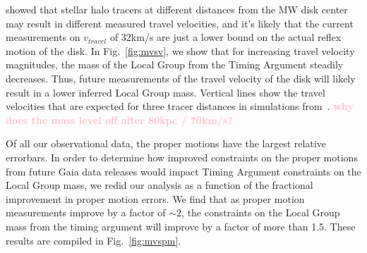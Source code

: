\documentclass[twocolumn]{aastex631}
\newcommand{\kc}[1]{\textcolor{pink}{\textbf{#1}} }
\begin{document}
\cite{Garavito-Camargo2021b} showed that stellar halo tracers at different distances from the MW disk center may result in different measured travel velocities, and it's likely that the current measurements on $v_{travel}$ of 32km/s are just a lower bound on the actual reflex motion of the disk. In Fig.~\ref{fig:mvsv}, we show that for increasing travel velocity magnitudes, the mass of the Local Group from the Timing Argument steadily decreases. Thus, future measurements of the travel velocity of the disk will likely result in a lower inferred Local Group mass. Vertical lines show the travel velocities that are expected for three tracer distances in simulations from~\cite{Garavito-Camargo2021b}. \kc{why does the mass level off after 80kpc / 70km/s? }

Of all our observational data, the proper motions have the largest relative errorbars. In order to determine how improved constraints on the proper motions from future Gaia data releases would impact Timing Argument constraints on the Local Group mass, we redid our analysis as a function of the fractional improvement in proper motion errors. 
We find that as proper motion measurements improve by a factor of $\sim2$, the constraints on the Local Group mass from the timing argument will improve by a factor of more than 1.5. These results are compiled in Fig.~\ref{fig:mvspm}.
\end{document}
